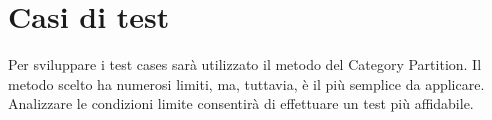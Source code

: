 \chapter{Casi di test}
Per sviluppare i test cases sarà utilizzato il metodo del Category Partition. Il metodo scelto ha numerosi limiti, ma, tuttavia, è il più semplice da applicare. Analizzare le condizioni limite consentirà di effettuare un test più affidabile.